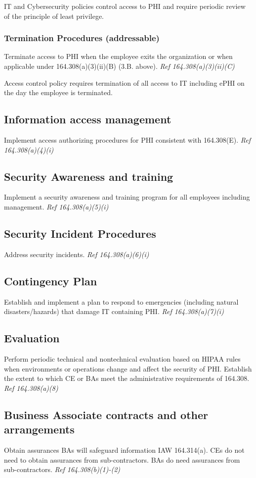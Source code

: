 \documentclass[../main.tex]{subfiles}
\begin{document}
            \vspace{3mm}

            \noindent IT and Cybersecurity policies control access to PHI and require periodic review of the principle of least privilege.

        \subsubsection{Termination Procedures (addressable)}
            Terminate access to PHI when the employee exits the organization or when applicable under 164.308(a)(3)(ii)(B) (3.B. above). \emph{Ref 164.308(a)(3)(ii)(C)}\cite{us}

            \vspace{3mm}

            \noindent Access control policy requires termination of all access to IT including ePHI on the day the employee is terminated.

    \subsection{Information access management}
        Implement access authorizing procedures for PHI consistent with 164.308(E). \emph{Ref 164.308(a)(4)(i)}\cite{us}

    \subsection{Security Awareness and training}
        Implement a security awareness and training program for all employees including management. \emph{Ref 164.308(a)(5)(i)}\cite{us}

    \subsection{Security Incident Procedures}
        Address security incidents. \emph{Ref 164.308(a)(6)(i)}\cite{us}

    \subsection{Contingency Plan}
        Establish and implement a plan to respond to emergencies (including natural disasters/hazards) that damage IT containing PHI. \emph{Ref 164.308(a)(7)(i)}\cite{us}

    \subsection{Evaluation}
        Perform periodic technical and nontechnical evaluation based on HIPAA rules when environments or operations change and affect the security of PHI. Establish the extent to which CE or BAs meet the administrative requirements of 164.308. \emph{Ref 164.308(a)(8)}\cite{us}

    \subsection{Business Associate contracts and other arrangements}
        Obtain assurances BAs will safeguard information IAW 164.314(a). CEs do not need to obtain assurances from sub-contractors. BAs do need assurances from sub-contractors. \emph{Ref 164.308(b)(1)-(2)}\cite{us}
\end{document}

